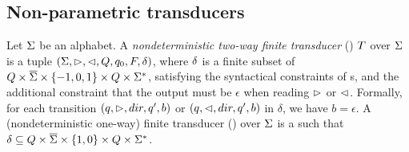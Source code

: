 \subsection{Non-parametric transducers}
\begin{definition}
    Let $\Sigma$ be an alphabet.
    A \emph{nondeterministic two-way finite  transducer} (\FFT{}) $T$  over 
    $\Sigma$ is a tuple $(\Sigma, \vartriangleright, \vartriangleleft, Q, q_0, F, \delta)$, where $\delta$ is  a finite subset of $Q \times 
    \overline{\Sigma}\times \{-1, 0, 1\}\times 
    Q \times \Sigma^*$, satisfying the syntactical constraints of \FFA{}s, and the additional constraint that the output must be $\epsilon$ when reading $\vartriangleright$ or $\vartriangleleft$. Formally, for each transition $(q, \vartriangleright, dir, q', b)$ or $(q, \vartriangleleft, dir, q', b)$ in $\delta$, we have $b=\epsilon$.
%
%
    A (nondeterministic one-way) finite transducer (\FT{}) over
    $\Sigma$
    is a \FFT{} such that 
     $\delta \subseteq Q \times \overline{\Sigma} \times
    \{1,0\} \times Q \times \Sigma^*$.
\end{definition}
